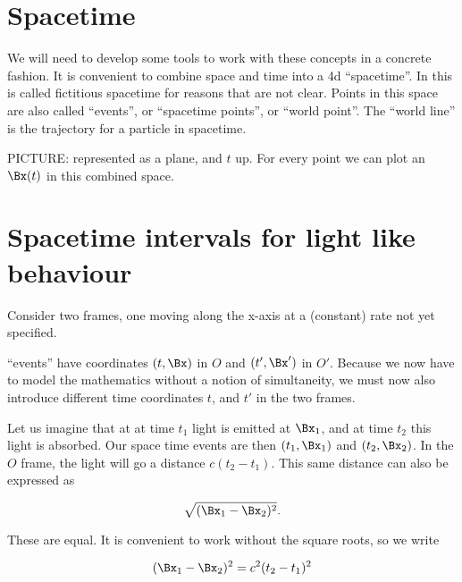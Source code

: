 %
%
\section{Spacetime}

We will need to develop some tools to work with these concepts in a concrete fashion.  It is convenient to combine space  and time  into a 4d ``spacetime''.  In \citep{landau1980classical} this is called fictitious spacetime for reasons that are not clear.  Points in this space are also called ``events'', or ``spacetime points'', or ``world point''.  The ``world line'' is the trajectory for a particle in spacetime.

PICTURE:  represented as a plane, and \(t\) up.  For every point we can plot an \(\Bx(t)\) in this combined space.

\section{Spacetime intervals for light like behaviour}

Consider two frames, one moving along the x-axis at a (constant) rate not yet specified.

``events'' have coordinates \((t, \Bx)\) in \(O\) and \((t', \Bx')\) in \(O'\).  Because we now have to model the mathematics without a notion of simultaneity, we must now also introduce different time coordinates \(t\), and \(t'\) in the two frames.  

Let us imagine that at at time \(t_1\) light is emitted at \(\Bx_1\), and at time \(t_2\) this light is absorbed.  Our space time events are then \((t_1, \Bx_1)\) and \((t_2, \Bx_2)\).  In the \(O\) frame, the light will go a distance \(c(t_2 - t_1)\).  This same distance can also be expressed as

\begin{equation}\label{eqn:relativisticElectrodynamicsL2:10}
\sqrt{ (\Bx_1 - \Bx_2)^2}.
\end{equation}

These are equal.  It is convenient to work without the square roots, so we write

\begin{equation}\label{eqn:relativisticElectrodynamicsL2:20}
(\Bx_1 - \Bx_2)^2 = c^2 (t_2 - t_1)^2
\end{equation}

